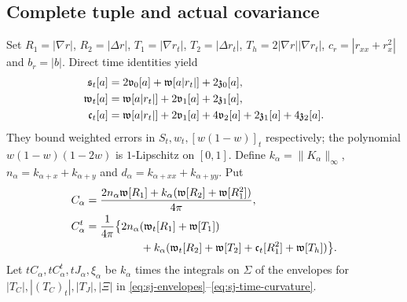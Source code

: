 \subsection{Complete tuple and actual covariance}
Set $R_1=|\nabla r|$, $R_2=|\Delta r|$, $T_1=|\nabla r_t|$,
$T_2=|\Delta r_t|$, $T_h=2|\nabla r||\nabla r_t|$,
$c_r=|r_{xx}+r_x^2|$ and $b_r=|b|$. Direct time identities yield
\begin{align}
 \mathfrak s_t[a]&=2\mathfrak v_0[a]+\mathfrak w[a|r_t|]+2\mathfrak z_0[a],\notag\\
 \mathfrak w_t[a]&=\mathfrak w[a|r_t|]+2\mathfrak v_1[a]+2\mathfrak z_1[a],\notag\\
 \mathfrak c_t[a]&=\mathfrak w[a|r_t|]+2\mathfrak v_1[a]+4\mathfrak v_2[a]
                                +2\mathfrak z_1[a]+4\mathfrak z_2[a].
 \label{eq:sj-time-ledger}
\end{align}
They bound weighted errors in $S_t,w_t,[w(1-w)]_t$ respectively;
the polynomial $w(1-w)(1-2w)$ is $1$-Lipschitz on $[0,1]$.
Define $k_\alpha=\|K_\alpha\|_\infty$,
$n_\alpha=k_{\alpha+x}+k_{\alpha+y}$ and
$d_\alpha=k_{\alpha+xx}+k_{\alpha+yy}$. Put
\begin{align}
 C_\alpha&=\frac{2n_\alpha\mathfrak w[R_1]
             +k_\alpha(\mathfrak w[R_2]+\mathfrak w[R_1^2])}{4\pi},\notag\\
 C^t_\alpha&=\frac1{4\pi}\bigl\{2n_\alpha(\mathfrak w_t[R_1]
                    +\mathfrak w[T_1])\notag\\
 &\hspace{5em}+k_\alpha(\mathfrak w_t[R_2]+\mathfrak w[T_2]
                    +\mathfrak c_t[R_1^2]+\mathfrak w[T_h])\bigr\}.
 \label{eq:sj-curvature-ledger}
\end{align}
Let $tC_\alpha,tC^t_\alpha,tJ_\alpha,\xi_\alpha$ be $k_\alpha$
times the integrals on $\Sigma$ of the envelopes for
$|T_C|,|(T_C)_t|,|T_J|,|\Xi|$ in
\eqref{eq:sj-envelopes}--\eqref{eq:sj-time-curvature}.

